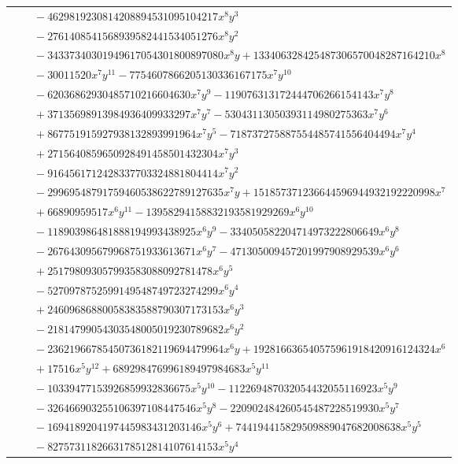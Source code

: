 \documentclass[11pt]{article}
\begin{document}
\begin{longtable}{@{}ll@{}}
 & $\quad -4629819230814208894531095104217x^{8}y^{3}$\\
 & $\quad -2761408541568939582441534051276x^{8}y^{2}$\\
 & $\quad -34337340301949617054301800897080x^{8}y+133406328425487306570048287164210x^{8}$\\
 & $\quad -30011520x^{7}y^{11}-7754607866205130336167175x^{7}y^{10}$\\
 & $\quad -62036862930485710216604630x^{7}y^{9}-119076313172444706266154143x^{7}y^{8}$\\
 & $\quad +37135698913984936409933297x^{7}y^{7}-53043113050393114980275363x^{7}y^{6}$\\
 & $\quad +867751915927938132893991964x^{7}y^{5}-718737275887554485741556404494x^{7}y^{4}$\\
 & $\quad +2715640859650928491458501432304x^{7}y^{3}$\\
 & $\quad -9164561712428337703324881804414x^{7}y^{2}$\\
 & $\quad -29969548791759460538622789127635x^{7}y+151857371236644596944932192220998x^{7}$\\
 & $\quad +66890959517x^{6}y^{11}-13958294158832193581929269x^{6}y^{10}$\\
 & $\quad -118903986481888194993438925x^{6}y^{9}-334050582204714973222806649x^{6}y^{8}$\\
 & $\quad -267643095679968751933613671x^{6}y^{7}-471305009457201997908929539x^{6}y^{6}$\\
 & $\quad +251798093057993583088092781478x^{6}y^{5}$\\
 & $\quad -5270978752599149548749723274299x^{6}y^{4}$\\
 & $\quad +24609686880058383588790307173153x^{6}y^{3}$\\
 & $\quad -21814799054303548005019230789682x^{6}y^{2}$\\
 & $\quad -23621966785450736182119694479964x^{6}y+192816636540575961918420916124324x^{6}$\\
 & $\quad +17516x^{5}y^{12}+689298476996189497984683x^{5}y^{11}$\\
 & $\quad -10339477153926859932836675x^{5}y^{10}-112269487032054432055116923x^{5}y^{9}$\\
 & $\quad -326466903255106397108447546x^{5}y^{8}-220902484260545487228519930x^{5}y^{7}$\\
 & $\quad -1694189204197445983431203146x^{5}y^{6}+744194415829509889047682008638x^{5}y^{5}$\\
 & $\quad -8275731182663178512814107614153x^{5}y^{4}$\\

\end{longtable}
\end{document}
